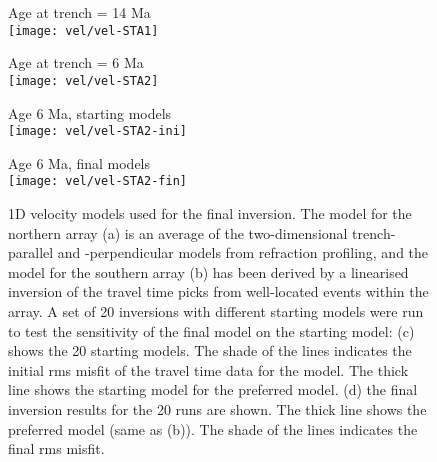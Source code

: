\documentclass[reviewcopy]{elsart}
\renewcommand{\includegraphics}[2][]{\fbox{#2}}
\begin{document}
\begin{figure}
\begin{minipage}[t]{0.49\textwidth}
{ Age at trench = 14 Ma} \\
\texttt{[image: vel/vel-STA1]}
\end{minipage}\hfill%
\begin{minipage}[t]{0.49\textwidth}
{  Age at trench = 6 Ma} \\
\texttt{[image: vel/vel-STA2]}
\end{minipage}
\vspace{1.5\baselineskip}

\begin{minipage}[t]{0.49\textwidth}
{ Age 6 Ma, starting models} \\
\texttt{[image: vel/vel-STA2-ini]}
\end{minipage}\hfill%
\begin{minipage}[t]{0.49\textwidth}
{ Age 6 Ma, final models} \\
\texttt{[image: vel/vel-STA2-fin]}
\end{minipage}

\caption{1D velocity models used for the final inversion.  The model
  for the northern array (a) is an average of the two-dimensional
  trench-parallel and -perpendicular models from refraction profiling,
and the model for the southern array (b) has been derived by a linearised
inversion of the travel time picks from well-located events within the
array.  A set of 20 inversions with different starting models were run
to test the sensitivity of the final model on the starting model: (c)
shows the 20 starting models. The shade of the lines indicates the
initial rms
misfit of the travel time data for the model.  The thick line shows the starting
model for the preferred model. 
 (d) the final inversion results for the 20 runs are
shown.  The thick line shows the preferred model (same as (b)). The shade of the lines indicates the
final rms misfit. 
}
\label{figa:velocity}
\end{figure}


\end{document}
